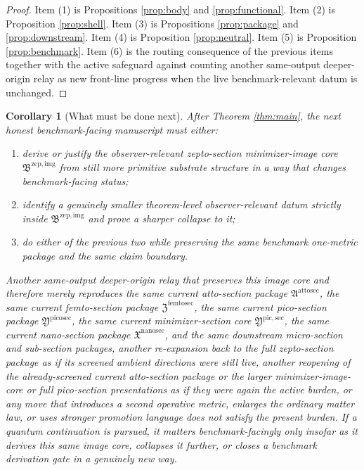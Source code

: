\documentclass[11pt]{article}
\newcommand{\NanoSectionPackage}{\mathfrak X^{\mathrm{nanosec}}}
\newcommand{\PicoSectionPackage}{\mathfrak Y^{\mathrm{picosec}}}
\newcommand{\PicoMinSectionCore}{\mathfrak Y^{\mathrm{pic,sec}}}
\newcommand{\FemtoSectionPackage}{\mathfrak Z^{\mathrm{femtosec}}}
\newcommand{\AttoSectionPackage}{\mathfrak A^{\mathrm{attosec}}}
\newcommand{\ZeptoImageCore}{\mathfrak B^{\mathrm{zep,img}}}
\newtheorem{corollary}{Corollary}
\begin{document}
\begin{proof}
Item (1) is Propositions \ref{prop:body} and \ref{prop:functional}. Item (2) is Proposition \ref{prop:shell}. Item (3) is Propositions \ref{prop:package} and \ref{prop:downstream}. Item (4) is Proposition \ref{prop:neutral}. Item (5) is Proposition \ref{prop:benchmark}. Item (6) is the routing consequence of the previous items together with the active safeguard against counting another same-output deeper-origin relay as new front-line progress when the live benchmark-relevant datum is unchanged.
\end{proof}

\begin{corollary}[What must be done next]
\label{cor:next}
After Theorem \ref{thm:main}, the next honest benchmark-facing manuscript must either:
\begin{enumerate}
    \item derive or justify the observer-relevant zepto-section minimizer-image core \(\ZeptoImageCore\) from still more primitive substrate structure in a way that changes benchmark-facing status;
    \item identify a genuinely smaller theorem-level observer-relevant datum strictly inside \(\ZeptoImageCore\) and prove a sharper collapse to it;
    \item do either of the previous two while preserving the same benchmark one-metric package and the same claim boundary.
\end{enumerate}
Another same-output deeper-origin relay that preserves this image core and therefore merely reproduces the same current atto-section package \(\AttoSectionPackage\), the same current femto-section package \(\FemtoSectionPackage\), the same current pico-section package \(\PicoSectionPackage\), the same current minimizer-section core \(\PicoMinSectionCore\), the same current nano-section package \(\NanoSectionPackage\), and the same downstream micro-section and sub-section packages, another re-expansion back to the full zepto-section package as if its screened ambient directions were still live, another reopening of the already-screened current atto-section package or the larger minimizer-image-core or full pico-section presentations as if they were again the active burden, or any move that introduces a second operative metric, enlarges the ordinary matter law, or uses stronger promotion language does not satisfy the present burden. If a quantum continuation is pursued, it matters benchmark-facingly only insofar as it derives this same image core, collapses it further, or closes a benchmark derivation gate in a genuinely new way.
\end{corollary}
\end{document}
